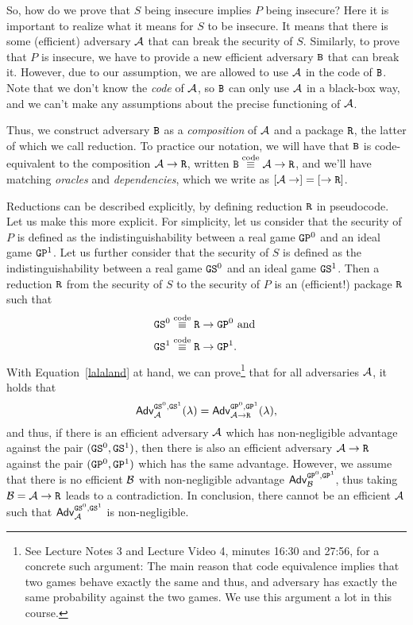 \documentclass[a4paper,table,dvipsnames]{article}
\theoremstyle{definition}
\newcommand{\M}[1]{\ensuremath{\text{\texttt{#1}}}}
\begin{document}
So, how do we prove that $S$ being insecure implies $P$ being insecure? Here it is important to realize what it means for $S$ to be insecure. It means that there is some (efficient) adversary $\mathcal{A}$ that can break the security of $S$. Similarly, to prove that $P$ is insecure, we have to provide a new efficient adversary $\M{B}$ that can break it. However, due to our assumption, we are allowed to use $\mathcal{A}$ in the code of $\M{B}$. Note that we don't know the \emph{code} of $\mathcal{A}$, so $\M{B}$ can only use $\mathcal{A}$ in a black-box way, and we can't make any assumptions about the precise functioning of $\mathcal{A}$.

Thus, we construct adversary $\M{B}$ as a \emph{composition} of $\mathcal{A}$ and a package $\M{R}$, the latter of which we call reduction. To practice our notation, we will have that $\M{B}$ is code-equivalent to the composition $\adv\rightarrow\M{R}$, written $\M{B}\stackrel{\text{code}}{\equiv}\adv\rightarrow\M{R}$, and we'll have matching \emph{oracles} and \emph{dependencies}, which we write as $[\adv\rightarrow]=[\rightarrow\M{R}]$.

Reductions can be described explicitly, by defining reduction $\M{R}$ in pseudocode. Let us make this more explicit.
For simplicity, let us consider that the security of $P$ is defined as the indistinguishability between a real game $\M{GP}^0$
and an ideal game $\M{GP}^1$. Let us further consider that the security of $S$ is defined as the indistinguishability between
a real game $\M{GS}^0$ and an ideal game $\M{GS}^1$. Then a reduction $\M{R}$ from the security of $S$ to the security of $P$
is an (efficient!) package $\M{R}$ such that
\begin{align}
\notag          &\M{GS}^0\stackrel{\text{code}}{\equiv}\M{R}\rightarrow\M{GP}^0\text{ and }\\
\label{lalaland}&\M{GS}^1\stackrel{\text{code}}{\equiv}\M{R}\rightarrow\M{GP}^1.
\end{align}
With Equation~\ref{lalaland} at hand, we can prove\footnote{See Lecture Notes 3 and Lecture Video 4, minutes 16:30 and 27:56, for a concrete such argument: The main reason that code equivalence implies that two games behave exactly the same and thus, and adversary has exactly the same probability against the two games. We use this argument a lot in this course.}  that for all adversaries $\mathcal{A}$, it holds that 
\begin{equation}\label{lalaland1}
\mathsf{Adv}^{\M{GS}^0,\M{GS}^1}_\adv(\lambda)=\mathsf{Adv}^{\M{GP}^0,\M{GP}^1}_{\adv\rightarrow\M{R}}(\lambda),
\end{equation}
and thus, if there is an efficient adversary $\mathcal{A}$ which has non-negligible advantage against the pair $(\M{GS}^0,\M{GS}^1)$,
then there is also an efficient adversary $\adv\rightarrow\M{R}$ against the pair $(\M{GP}^0,\M{GP}^1)$ which has the same
advantage. However, we assume that there is no efficient $\mathcal{B}$ with non-negligible advantage $\mathsf{Adv}^{\M{GP}^0,\M{GP}^1}_{\bdv}$, thus taking $\bdv=\adv\rightarrow\M{R}$ leads to a contradiction. In conclusion, there cannot be an efficient $\mathcal{A}$ such that $\mathsf{Adv}^{\M{GS}^0,\M{GS}^1}_\adv$ is non-negligible.
\end{document}
